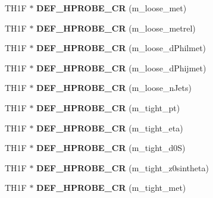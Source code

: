 \begin{DoxyCompactItemize}
\item 
\hypertarget{classHistos__Fake_a54745fc026493c8c4ddb2dce790da393}{
TH1F $\ast$ {\bfseries DEF\_\-HPROBE\_\-CR} (m\_\-loose\_\-met)}
\label{classHistos__Fake_a54745fc026493c8c4ddb2dce790da393}

\item 
\hypertarget{classHistos__Fake_a6d0252c5698893c54975b789403e1bb3}{
TH1F $\ast$ {\bfseries DEF\_\-HPROBE\_\-CR} (m\_\-loose\_\-metrel)}
\label{classHistos__Fake_a6d0252c5698893c54975b789403e1bb3}

\item 
\hypertarget{classHistos__Fake_aa656f8db1fb94473dc3fd8af9b067736}{
TH1F $\ast$ {\bfseries DEF\_\-HPROBE\_\-CR} (m\_\-loose\_\-dPhilmet)}
\label{classHistos__Fake_aa656f8db1fb94473dc3fd8af9b067736}

\item 
\hypertarget{classHistos__Fake_a4bde43d07226dbe23b24db98b2bedbfe}{
TH1F $\ast$ {\bfseries DEF\_\-HPROBE\_\-CR} (m\_\-loose\_\-dPhijmet)}
\label{classHistos__Fake_a4bde43d07226dbe23b24db98b2bedbfe}

\item 
\hypertarget{classHistos__Fake_aa26bf537ad1cec13811ae32fda5a5254}{
TH1F $\ast$ {\bfseries DEF\_\-HPROBE\_\-CR} (m\_\-loose\_\-nJets)}
\label{classHistos__Fake_aa26bf537ad1cec13811ae32fda5a5254}

\item 
\hypertarget{classHistos__Fake_a6d09da761d5066e5502b0cb3551f3341}{
TH1F $\ast$ {\bfseries DEF\_\-HPROBE\_\-CR} (m\_\-tight\_\-pt)}
\label{classHistos__Fake_a6d09da761d5066e5502b0cb3551f3341}

\item 
\hypertarget{classHistos__Fake_a83df179fb7c863073999a35431ee2608}{
TH1F $\ast$ {\bfseries DEF\_\-HPROBE\_\-CR} (m\_\-tight\_\-eta)}
\label{classHistos__Fake_a83df179fb7c863073999a35431ee2608}

\item 
\hypertarget{classHistos__Fake_a845442d626067cf9eff2ffb12f5be8ef}{
TH1F $\ast$ {\bfseries DEF\_\-HPROBE\_\-CR} (m\_\-tight\_\-d0S)}
\label{classHistos__Fake_a845442d626067cf9eff2ffb12f5be8ef}

\item 
\hypertarget{classHistos__Fake_a4a1e9f2816be15c3693328c55f9c79b0}{
TH1F $\ast$ {\bfseries DEF\_\-HPROBE\_\-CR} (m\_\-tight\_\-z0sintheta)}
\label{classHistos__Fake_a4a1e9f2816be15c3693328c55f9c79b0}

\item 
\hypertarget{classHistos__Fake_a5b2e186d9b290866c11283d45c1aab68}{
TH1F $\ast$ {\bfseries DEF\_\-HPROBE\_\-CR} (m\_\-tight\_\-met)}
\label{classHistos__Fake_a5b2e186d9b290866c11283d45c1aab68}


\end{DoxyCompactItemize}
